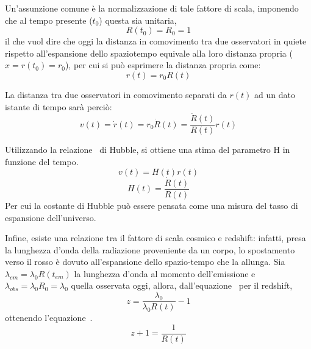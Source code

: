 Un'assunzione comune è la normalizzazione di tale fattore di scala, imponendo che al tempo presente ($t_0$) questa sia unitaria,
\[
    R(t_0) = R_0 = 1
\]
il che vuol dire che oggi la distanza in comovimento tra due osservatori in quiete rispetto all'espansione dello spaziotempo equivale alla loro distanza propria ($x = r(t_0) = r_0$), per cui si può esprimere la distanza propria come:
\[
    r(t)= r_0 R(t)
\]

La distanza tra due osservatori in comovimento separati da $r(t)$ ad un dato istante di tempo sarà perciò:
\begin{equation}\label{eq:hubble-speed}
    v(t) = \dot{r}(t) = r_0 \dot{R}(t) = \frac{\dot{R}(t)}{R(t)}r(t)
\end{equation}

Utilizzando la relazione~ di Hubble, si ottiene una stima del parametro H in funzione del tempo.
\[
    v(t) = H(t)r(t)
\]
\begin{equation}\label{eq:hubble-scale}
    H(t) = \frac{\dot{R}(t)}{R(t)}
\end{equation}
Per cui la costante di Hubble può essere pensata come una misura del tasso di espansione dell'universo.

Infine, esiste una relazione tra il fattore di scala cosmico e redshift: infatti, presa la lunghezza d'onda della radiazione proveniente da un corpo, lo spostamento verso il rosso è dovuto all'espansione dello spazio-tempo che la allunga. Sia $\lambda_{em} = \lambda_0 R(t_{em})$ la lunghezza d'onda al momento dell'emissione e $\lambda_{obs} = \lambda_0 R_0 = \lambda_0$ quella osservata oggi, allora, dall'equazione~ per il redshift,
\[
    z = \frac{\lambda_0}{\lambda_0 R(t)}-1
\]
ottenendo l'equazione~.
\begin{equation}\label{eq:redshift-rescale}
    z + 1 = \frac{1}{R(t)} 
\end{equation}